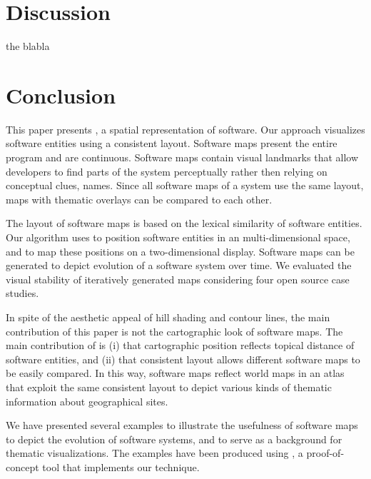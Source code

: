 \chapter{Discussion}
the blabla

\chapter{Conclusion}

This paper presents \SOCA, a spatial representation of software. Our approach visualizes software entities using a consistent layout. Software maps present the entire program and are continuous. Software maps contain visual landmarks that allow developers to find parts of the system perceptually rather then relying on conceptual clues, \eg names. Since all software maps of a system use the same layout, maps with thematic overlays can be compared to each other.

The layout of software maps is based on the lexical similarity of software entities. Our algorithm uses \LSI to position software entities in an multi-dimensional space, and \MDS to map these positions on a two-dimensional display. Software maps can be generated to depict evolution of a software system over time. We evaluated the visual stability of iteratively generated maps considering four open source case studies.

In spite of the aesthetic appeal of hill shading and contour lines, the main contribution of this paper is not the cartographic look of software maps. The main contribution of \SOCA is (i) that cartographic position reflects topical distance of software entities, and (ii) that consistent layout allows different software maps to be easily compared.
In this way, software maps reflect world maps in an atlas that exploit the same consistent layout to depict various kinds of thematic information about geographical sites.

We have presented several examples to illustrate the usefulness of software maps to depict the evolution of software systems, and to serve as a background for thematic visualizations.
The examples have been produced using \TOOL, a proof-of-concept tool that implements our technique.

